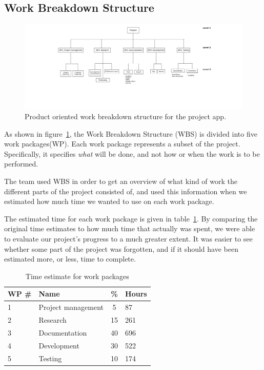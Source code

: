 
\subsection{Work Breakdown Structure}
\label{sec:wbs}

\begin{figure}[H]
\includegraphics[width=\textwidth, trim=9.5cm 6cm 8.5cm 0.9cm,clip]{ch/projectManagement/fig/wbs2.png}
\caption{Product oriented work breakdown structure for the project app.}
\label{fig:wbs}
\end{figure}

As shown in figure~\ref{fig:wbs}, the Work Breakdown Structure (WBS) is divided into five work packages(WP). Each work package represents a subset of the project. Specifically, it specifies \emph{what} will be done, and not how or when the work is to be performed.

The team used WBS in order to get an overview of what kind of work the different parts of the project consisted of, and used this information when we estimated how much time we wanted to use on each work package.

The estimated time for each work package is given in table~\ref{tab:timeEstWP}. By comparing the original time estimates to how much time that actually was spent, we were able to evaluate our project's progress to a much greater extent. It was easier to see whether some part of the project was forgotten, and if it should have been estimated more, or less, time to complete.

\begin{table}[H]
\centering
{}
\begin{tabular}{|l|l|c|l|}
\hline
    \textbf{WP \#} & \textbf{Name} & \textbf{\%} & \textbf{Hours} \\\hline
    1 & Project management & 5 & 87\\\hline
    2 & Research		   & 15 & 261\\\hline
    3 & Documentation	   & 40 & 696\\\hline
    4 & Development 	   & 30 & 522\\\hline
    5 & Testing  		   & 10 & 174\\\hline
\end{tabular}
\caption{Time estimate for work packages}
\label{tab:timeEstWP}
\end{table}